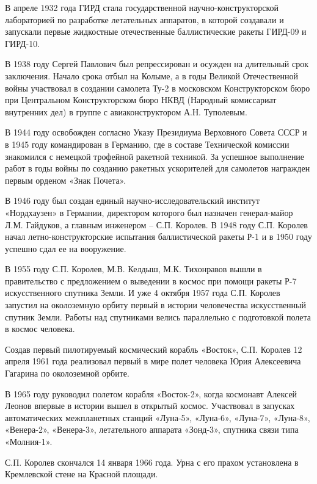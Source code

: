 В апреле 1932 года ГИРД стала государственной научно-конструкторской
лабораторией по разработке летательных аппаратов, в которой создавали и
запускали первые жидкостные отечественные баллистические ракеты ГИРД-09 и
ГИРД-10.

В 1938 году Сергей Павлович был репрессирован и осужден на длительный срок
заключения. Начало срока отбыл на Колыме, а в годы Великой Отечественной войны
участвовал в создании самолета Ту-2 в московском Конструкторском бюро при
Центральном Конструкторском бюро НКВД (Народный комиссариат внутренних дел) в
группе с авиаконструктором А.Н. Туполевым.

В 1944 году освобожден согласно Указу Президиума Верховного Совета СССР и в
1945 году командирован в Германию, где в составе Технической комиссии
знакомился с немецкой трофейной ракетной техникой. За успешное выполнение работ
в годы войны по созданию ракетных ускорителей для самолетов награжден первым
орденом «Знак Почета».


В 1946 году был создан единый научно-исследовательский институт «Нордхаузен» в
Германии, директором которого был назначен генерал-майор Л.М. Гайдуков, а
главным инженером – С.П. Королев. В 1948 году С.П. Королев начал
летно-конструкторские испытания баллистической ракеты Р-1 и в 1950 году успешно
сдал ее на вооружение.

В 1955 году С.П. Королев, М.В. Келдыш, М.К. Тихонравов вышли в правительство с
предложением о выведении в космос при помощи ракеты Р-7 искусственного спутника
Земли. И уже 4 октября 1957 года С.П. Королев запустил на околоземную орбиту
первый в истории человечества искусственный спутник Земли. Работы над
спутниками велись параллельно с подготовкой полета в космос человека.

Создав первый пилотируемый космический корабль «Восток», С.П. Королев 12 апреля
1961 года реализовал первый в мире полет человека Юрия Алексеевича Гагарина по
околоземной орбите.

В 1965 году руководил полетом корабля «Восток-2», когда космонавт Алексей
Леонов впервые в истории вышел в открытый космос. Участвовал в запусках
автоматических межпланетных станций «Луна-5», «Луна-6»,  «Луна-7», «Луна-8»,
«Венера-2», «Венера-3», летательного аппарата  «Зонд-3», спутника связи типа
«Молния-1».

С.П. Королев скончался 14 января 1966 года. Урна с его прахом установлена в
Кремлевской стене на Красной площади.

